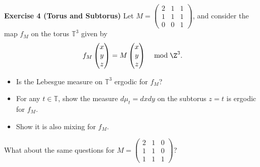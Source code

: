 \textbf{Exercise 4 (Torus and Subtorus)} Let $M=\begin{pmatrix}2 & 1 & 1 \\ 1 & 1 & 1 \\ 0 & 0 & 1\end{pmatrix}$, 
and consider the map $f_{M}$ on the torus $\mathbb{T}^{3}$ given by
$$f_{M}\begin{pmatrix}x \\ y \\ z\end{pmatrix}
=M\begin{pmatrix}x \\ y \\ z\end{pmatrix} \quad \bmod \Z^{3}.$$
\begin{itemize}
\item Is the Lebesgue measure on $\mathbb{T}^{3}$ ergodic for $f_{M}$?
\item For any $t \in \mathbb{T}$, show the measure $d\mu_{t}=dx dy$ on the subtorus $z=t$ is ergodic for $f_{M}$.
\item Show it is also mixing for $f_{M}$.
\end{itemize}

What about the same questions for $M=\begin{pmatrix}2 & 1 & 0 \\ 1 & 1 & 0 \\ 1 & 1 & 1\end{pmatrix}$?